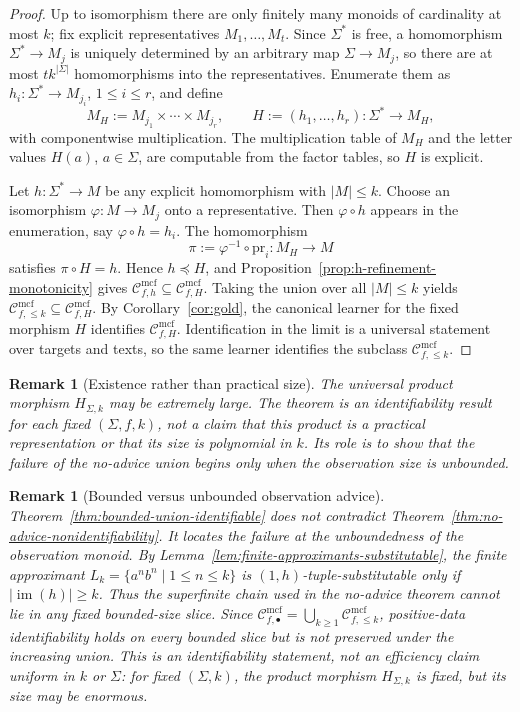 \documentclass[11pt,a4paper]{article}
\newtheorem{remark}[theorem]{Remark}
\theoremstyle{remark}
\newcommand{\Cmcf}[2]{\mathcal{C}^{\mathrm{mcf}}_{#1,#2}}
\begin{document}
\begin{proof}
Up to isomorphism there are only finitely many monoids of cardinality at most
\(k\); fix explicit representatives \(M_1,\ldots,M_t\).  Since \(\Sigma^*\) is
free, a homomorphism \(\Sigma^*\to M_j\) is uniquely determined by an arbitrary
map \(\Sigma\to M_j\), so there are at most \(t k^{|\Sigma|}\) homomorphisms into
the representatives.  Enumerate them as
\(h_i:\Sigma^*\to M_{j_i}\), \(1\le i\le r\), and define
\[
  M_H:=M_{j_1}\times\cdots\times M_{j_r},
  \qquad
  H:=(h_1,\ldots,h_r):\Sigma^*\to M_H,
\]
with componentwise multiplication.  The multiplication table of \(M_H\) and the
letter values \(H(a)\), \(a\in\Sigma\), are computable from the factor tables, so
\(H\) is explicit.

Let \(h:\Sigma^*\to M\) be any explicit homomorphism with \(|M|\le k\).  Choose
an isomorphism \(\varphi:M\to M_j\) onto a representative.  Then
\(\varphi\circ h\) appears in the enumeration, say \(\varphi\circ h=h_i\).  The
homomorphism
\[
  \pi:=\varphi^{-1}\circ\mathrm{pr}_i:M_H\to M
\]
satisfies \(\pi\circ H=h\).  Hence \(h\preceq H\), and
Proposition~\ref{prop:h-refinement-monotonicity} gives
\(\Cmcf{f}{h}\subseteq\Cmcf{f}{H}\).  Taking the union over all \(|M|\le k\)
yields \(\Cmcf{f}{\le k}\subseteq\Cmcf{f}{H}\).  By
Corollary~\ref{cor:gold}, the canonical learner for the fixed morphism \(H\)
identifies \(\Cmcf{f}{H}\).  Identification in the limit is a universal
statement over targets and texts, so the same learner identifies the subclass
\(\Cmcf{f}{\le k}\).
\end{proof}

\begin{remark}[Existence rather than practical size]
\label{rem:universal-product-size}
The universal product morphism \(H_{\Sigma,k}\) may be extremely large.  The
theorem is an identifiability result for each fixed \((\Sigma,f,k)\), not a
claim that this product is a practical representation or that its size is
polynomial in \(k\).  Its role is to show that the failure of the no-advice
union begins only when the observation size is unbounded.
\end{remark}

\begin{remark}[Bounded versus unbounded observation advice]
\label{rem:bounded-vs-unbounded-union}
Theorem~\ref{thm:bounded-union-identifiable} does not contradict
Theorem~\ref{thm:no-advice-nonidentifiability}.  It locates the failure at the
unboundedness of the observation monoid.  By
Lemma~\ref{lem:finite-approximants-substitutable}, the finite approximant
\(L_k=\{a^n b^n\mid 1\le n\le k\}\) is \((1,h)\)-tuple-substitutable only if
\(|\operatorname{im}(h)|\ge k\).  Thus the superfinite chain used in the
no-advice theorem cannot lie in any fixed bounded-size slice.  Since
\(\Cmcf{f}{\bullet}=\bigcup_{k\ge1}\Cmcf{f}{\le k}\), positive-data
identifiability holds on every bounded slice but is not preserved under the
increasing union.  This is an identifiability statement, not an efficiency
claim uniform in \(k\) or \(\Sigma\): for fixed \((\Sigma,k)\), the product
morphism \(H_{\Sigma,k}\) is fixed, but its size may be enormous.
\end{remark}
\end{document}
